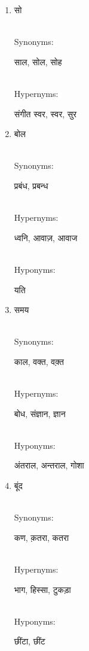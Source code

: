\documentclass{article}
\begin{document}
\begin{enumerate}
\item \begin{hindi}सो\end{hindi} \\
Synonyms: \begin{hindi}साल, सोल, सोह\end{hindi} \\
Hypernyms: \begin{hindi}संगीत स्वर, स्वर, सुर\end{hindi}

\item \begin{hindi}बोल\end{hindi} \\
Synonyms: \begin{hindi}प्रबंध, प्रबन्ध\end{hindi} \\
Hypernyms: \begin{hindi}ध्वनि, आवाज़, आवाज\end{hindi} \\
Hyponyms: \begin{hindi}यति\end{hindi}

\item \begin{hindi}समय\end{hindi} \\
Synonyms: \begin{hindi}काल, वक्त, वक़्त\end{hindi} \\
Hypernyms: \begin{hindi}बोध, संज्ञान, ज्ञान\end{hindi} \\
Hyponyms: \begin{hindi}अंतराल, अन्तराल, गोशा\end{hindi}

\item \begin{hindi}बूंद\end{hindi} \\
Synonyms: \begin{hindi}कण, क़तरा, कतरा\end{hindi} \\
Hypernyms: \begin{hindi}भाग, हिस्सा, टुकड़ा\end{hindi} \\
Hyponyms: \begin{hindi}छींटा, छींट\end{hindi}


\end{enumerate}
\end{document}
